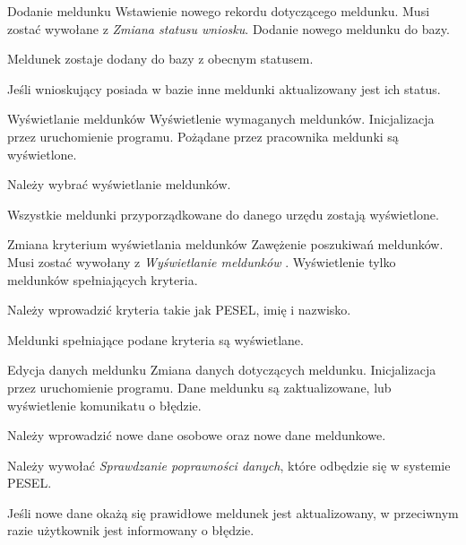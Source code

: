 \documentclass[12pt]{article}
\begin{document}
\scenario
    {Dodanie meldunku}
    {Wstawienie nowego rekordu dotyczącego meldunku.}
    {Musi zostać wywołane z \textit{Zmiana statusu wniosku}.}
    {Dodanie nowego meldunku do bazy.}
    {
        \item Meldunek zostaje dodany do bazy z obecnym statusem.
        \item Jeśli wnioskujący posiada w bazie inne meldunki aktualizowany jest ich status.
    }
    \scenario
    {Wyświetlanie meldunków}
    {Wyświetlenie wymaganych meldunków.}
    {Inicjalizacja przez uruchomienie programu.}
    {Pożądane przez pracownika meldunki są wyświetlone.}
    {
        \item Należy wybrać wyświetlanie meldunków.
        \item Wszystkie meldunki przyporządkowane do danego urzędu zostają wyświetlone.
    }
\scenario
    {Zmiana kryterium wyświetlania meldunków}
    {Zawężenie poszukiwań meldunków.}
    {Musi zostać wywołany z \textit{Wyświetlanie meldunków} .}
    {Wyświetlenie tylko meldunków spełniających kryteria.}
    {
        \item Należy wprowadzić kryteria takie jak PESEL, imię i nazwisko.
        \item Meldunki spełniające podane kryteria są wyświetlane.
    }
\scenario
    {Edycja danych meldunku}
    {Zmiana danych dotyczących meldunku.}
    {Inicjalizacja przez uruchomienie programu.}
    {Dane meldunku są zaktualizowane, lub wyświetlenie komunikatu o błędzie.}
    {
        \item Należy wprowadzić nowe dane osobowe oraz nowe dane meldunkowe.
        \item Należy wywołać \textit{Sprawdzanie poprawności danych}, które odbędzie się w systemie PESEL.
        \item Jeśli nowe dane okażą się prawidłowe meldunek jest aktualizowany, w przeciwnym razie użytkownik jest informowany o błędzie.
    }
\end{document}
